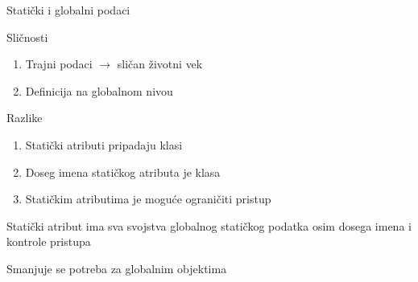 \documentclass{article}
\newenvironment{xitemize}{%
    
    \itemize
    \larger
}{%
    \enditemize
}
\let\olditemize\itemize
\let\endolditemize\enditemize
\renewenvironment{itemize}{%
    \smaller
    \olditemize
}{%
    \endolditemize
}
\begin{document}
\begin{xitemize}
\begin{itemize}
\end{itemize}
\newpage
\item Statički i globalni podaci
\begin{itemize}
    \item Sličnosti
    \begin{enumerate}
        \item Trajni podaci $\rightarrow$ sličan životni vek
        \item Definicija na globalnom nivou
    \end{enumerate}
    \item Razlike
    \begin{enumerate}
        \item Statički atributi pripadaju klasi
        \item Doseg imena statičkog atributa je klasa
        \item Statičkim atributima je moguće ograničiti pristup
    \end{enumerate}
    \item Statički atribut ima sva svojstva globalnog statičkog podatka osim dosega imena i kontrole pristupa
    \item Smanjuje se potreba za globalnim objektima
\end{itemize}



\end{xitemize}
\end{document}
